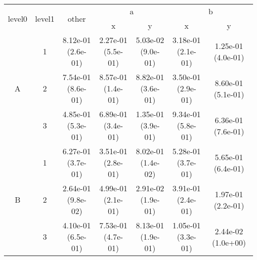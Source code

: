\begin{tabular}{ccccccc}
\toprule
\multirow{2}{*}{level0} & \multirow{2}{*}{level1}& \multirow{2}{*}{other}&\multicolumn{2}{c}{a}&\multicolumn{2}{c}{b}\tabularnewline
\cmidrule(lr){4-5}
\cmidrule(lr){6-7}
&&&x&y&x&y\tabularnewline
\midrule
\multirow{3}{*}{A}&1& 8.12e-01 (2.6e-01)& 2.27e-01 (5.5e-01)& 5.03e-02 (9.0e-01)& 3.18e-01 (2.1e-01)& 1.25e-01 (4.0e-01)\tabularnewline
&2& 7.54e-01 (8.6e-01)& 8.57e-01 (1.4e-01)& 8.82e-01 (3.6e-01)& 3.50e-01 (2.9e-01)& 8.60e-01 (5.1e-01)\tabularnewline
&3& 4.85e-01 (5.3e-01)& 6.89e-01 (3.4e-01)& 1.35e-01 (3.9e-01)& 9.34e-01 (5.8e-01)& 6.36e-01 (7.6e-01)\tabularnewline
\midrule
\multirow{3}{*}{B}&1& 6.27e-01 (3.7e-01)& 3.51e-01 (2.8e-01)& 8.02e-01 (1.4e-02)& 5.28e-01 (3.7e-01)& 5.65e-01 (6.4e-01)\tabularnewline
&2& 2.64e-01 (9.8e-02)& 4.99e-01 (2.1e-01)& 2.91e-02 (1.9e-01)& 3.91e-01 (2.4e-01)& 1.97e-01 (2.2e-01)\tabularnewline
&3& 4.10e-01 (6.5e-01)& 7.53e-01 (4.7e-01)& 8.13e-01 (1.9e-01)& 1.05e-01 (3.3e-01)& 2.44e-02 (1.0e+00)\tabularnewline
\bottomrule
\end{tabular}
